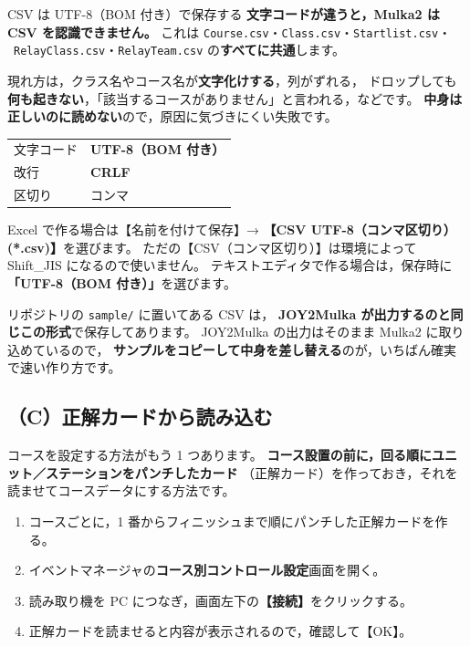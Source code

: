 \begin{Key}{CSV は UTF-8（BOM 付き）で保存する}
\textbf{文字コードが違うと，Mulka2 は CSV を認識できません。}
これは \texttt{Course.csv}・\texttt{Class.csv}・\texttt{Startlist.csv}・
\tRELAY\ \texttt{RelayClass.csv}・\texttt{RelayTeam.csv} の\textbf{すべてに共通}します。

現れ方は，クラス名やコース名が\textbf{文字化けする}，列がずれる，
ドロップしても\textbf{何も起きない}，「該当するコースがありません」と言われる，などです。
\textbf{中身は正しいのに読めない}ので，原因に気づきにくい失敗です。

\begin{center}
\small
\begin{tabular}{@{}P{34mm}P{108mm}@{}}
\toprule
{} &  \\
\midrule
文字コード & \textbf{UTF-8（BOM 付き）} \\
改行 & \textbf{CRLF} \\
区切り & コンマ \\
\bottomrule
\end{tabular}
\end{center}

Excel で作る場合は【名前を付けて保存】→
\textbf{【CSV UTF-8（コンマ区切り）(*.csv)】}を選びます。
ただの【CSV（コンマ区切り）】は環境によって Shift\_JIS になるので使いません。
テキストエディタで作る場合は，保存時に\textbf{「UTF-8（BOM 付き）」}を選びます。

リポジトリの \texttt{sample/} に置いてある CSV は，
\textbf{JOY2Mulka が出力するのと同じこの形式}で保存してあります。
JOY2Mulka の出力はそのまま Mulka2 に取り込めているので，
\textbf{サンプルをコピーして中身を差し替える}のが，いちばん確実で速い作り方です。
\end{Key}

\subsection*{（C）正解カードから読み込む}

コースを設定する方法がもう 1 つあります。
\textbf{コース設置の前に，回る順にユニット／ステーションをパンチしたカード}
（正解カード）を作っておき，それを読ませてコースデータにする方法です。

\begin{enumerate}
\item コースごとに，1 番からフィニッシュまで順にパンチした正解カードを作る。
\item イベントマネージャの\textbf{コース別コントロール設定}画面を開く。
\item 読み取り機を PC につなぎ，画面左下の\textbf{【接続】}をクリックする。
\item 正解カードを読ませると内容が表示されるので，確認して【OK】。
\end{enumerate}

